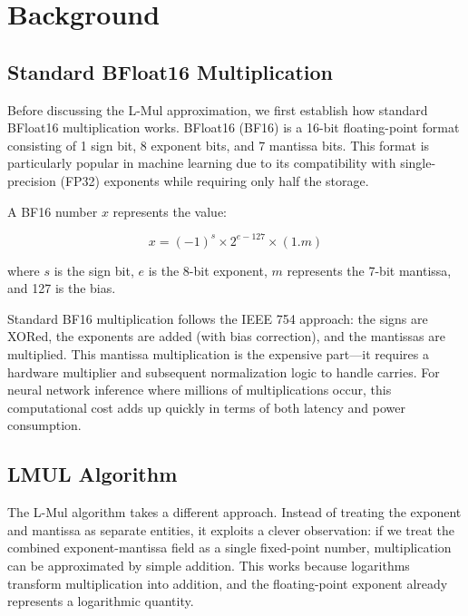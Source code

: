 \documentclass[12pt,letterpaper]{article}
\begin{document}
\section{Background}
\label{sec:background}

\subsection{Standard BFloat16 Multiplication}

\label{subsec:standard_bf16}

Before discussing the L-Mul approximation, we first establish how standard BFloat16 multiplication works. BFloat16 (BF16) is a 16-bit floating-point format consisting of 1 sign bit, 8 exponent bits, and 7 mantissa bits. This format is particularly popular in machine learning due to its compatibility with single-precision (FP32) exponents while requiring only half the storage.

A BF16 number $x$ represents the value:

\begin{equation}
x = (-1)^s \times 2^{e - 127} \times (1.m)
\label{eq:bf16_representation}
\end{equation}

where $s$ is the sign bit, $e$ is the 8-bit exponent, $m$ represents the 7-bit mantissa, and 127 is the bias.

Standard BF16 multiplication follows the IEEE 754 approach: the signs are XORed, the exponents are added (with bias correction), and the mantissas are multiplied. This mantissa multiplication is the expensive part—it requires a hardware multiplier and subsequent normalization logic to handle carries. For neural network inference where millions of multiplications occur, this computational cost adds up quickly in terms of both latency and power consumption.

\subsection{LMUL Algorithm}

\label{subsec:lmul_algorithm}

The L-Mul algorithm takes a different approach. Instead of treating the exponent and mantissa as separate entities, it exploits a clever observation: if we treat the combined exponent-mantissa field as a single fixed-point number, multiplication can be approximated by simple addition. This works because logarithms transform multiplication into addition, and the floating-point exponent already represents a logarithmic quantity.
\end{document}
